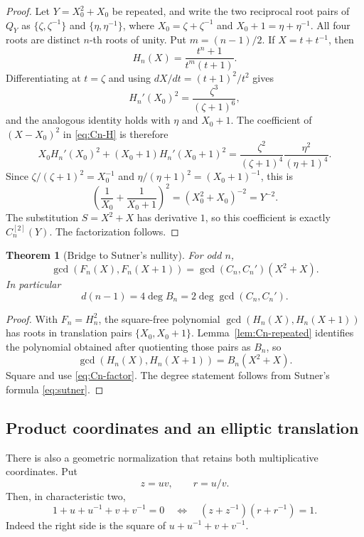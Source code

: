 \documentclass[a4paper]{article}
\newtheorem{theorem}{Theorem}[section]
\begin{document}
\begin{proof}
	Let $Y=X_0^2+X_0$ be repeated, and write the two reciprocal root pairs
	of $Q_Y$ as
	$\{\zeta,\zeta^{-1}\}$ and $\{\eta,\eta^{-1}\}$, where
	$X_0=\zeta+\zeta^{-1}$ and
	$X_0+1=\eta+\eta^{-1}$.  All four roots are distinct $n$-th roots of
	unity.  Put $m=(n-1)/2$.  If $X=t+t^{-1}$, then
	\[
		H_n(X)=\frac{t^n+1}{t^m(t+1)}.
	\]
	Differentiating at $t=\zeta$ and using
	$dX/dt=(t+1)^2/t^2$ gives
	\[
		H_n'(X_0)^2=\frac{\zeta^3}{(\zeta+1)^6},
	\]
	and the analogous identity holds with $\eta$ and $X_0+1$.
	The coefficient of $(X-X_0)^2$ in \eqref{eq:Cn-H} is therefore
	\[
		X_0H_n'(X_0)^2+(X_0+1)H_n'(X_0+1)^2
		=\frac{\zeta^2}{(\zeta+1)^4}
		 \frac{\eta^2}{(\eta+1)^4}.
	\]
	Since $\zeta/(\zeta+1)^2=X_0^{-1}$ and
	$\eta/(\eta+1)^2=(X_0+1)^{-1}$, this is
	\[
		\left(\frac1{X_0}+\frac1{X_0+1}\right)^2
		=(X_0^2+X_0)^{-2}=Y^{-2}.
	\]
	The substitution $S=X^2+X$ has derivative $1$, so this coefficient is
	exactly $C_n^{[2]}(Y)$.  The factorization follows.
\end{proof}

\begin{theorem}[Bridge to Sutner's nullity]\label{thm:Cn-bridge}
	For odd $n$,
	\begin{equation}\label{eq:Cn-bridge}
		\gcd\!\left(F_n(X),F_n(X+1)\right)
		=\gcd(C_n,C_n')(X^2+X).
	\end{equation}
	In particular
	\[
		d(n-1)=4\deg B_n=2\deg\gcd(C_n,C_n').
	\]
\end{theorem}

\begin{proof}
	With $F_n=H_n^2$, the square-free polynomial
	$\gcd(H_n(X),H_n(X+1))$ has roots in translation pairs
	$\{X_0,X_0+1\}$.  Lemma~\ref{lem:Cn-repeated} identifies the polynomial
	obtained after quotienting those pairs as $B_n$, so
	\[
		\gcd(H_n(X),H_n(X+1))=B_n(X^2+X).
	\]
	Square and use \eqref{eq:Cn-factor}.  The degree statement follows
	from Sutner's formula \eqref{eq:sutner}.
\end{proof}

\subsection{Product coordinates and an elliptic translation}

There is also a geometric normalization that retains both multiplicative
coordinates.  Put
\[
	z=uv,\qquad r=u/v.
\]
Then, in characteristic two,
\begin{equation}\label{eq:product-coordinates}
	1+u+u^{-1}+v+v^{-1}=0
	\quad\Longleftrightarrow\quad
	(z+z^{-1})(r+r^{-1})=1.
\end{equation}
Indeed the right side is the square of
$u+u^{-1}+v+v^{-1}$.
\end{document}
